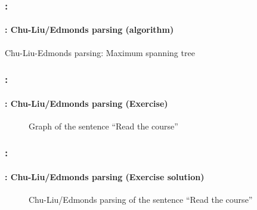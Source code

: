 \documentclass[xcolor=table]{beamer}
\begin{document}
\begin{frame}
	\frametitle{\insertshortsubtitle: \insertsection}
	\framesubtitle{\insertsubsection: Chu-Liu/Edmonds parsing (algorithm)}


	\begin{block}{Chu-Liu-Edmonds parsing: Maximum spanning tree}
		\scriptsize\vspace{-3pt}
		\begin{algorithm}[H]
			
			
			
		\end{algorithm}
	\end{block}

\end{frame}

\begin{frame}
	\frametitle{\insertshortsubtitle: \insertsection}
	\framesubtitle{\insertsubsection: Chu-Liu/Edmonds parsing (Exercise)}

	\begin{figure}
		\centering
		\caption{Graph of the sentence ``Read the course'' }
	\end{figure}

\end{frame}

\begin{frame}
	\frametitle{\insertshortsubtitle: \insertsection}
	\framesubtitle{\insertsubsection: Chu-Liu/Edmonds parsing (Exercise solution)}
	
	\begin{figure}
		\centering
		\caption{Chu-Liu/Edmonds parsing of the sentence ``Read the course'' }
	\end{figure}
	
\end{frame}


\end{document}
